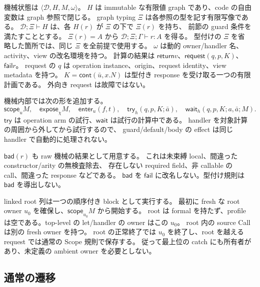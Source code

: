 \documentclass[11pt,a4paper]{article}
\newcommand{\Ret}{\mathsf{return}}
\newcommand{\Req}{\mathsf{request}}
\newcommand{\Fail}{\mathsf{fail}}
\newcommand{\Bad}{\mathsf{bad}}
\newcommand{\Scope}{\mathsf{scope}}
\newcommand{\D}{\mathcal D}
\newcommand{\ty}{\mathrel{\vdash}}
\begin{document}
機械状態は \(\langle\D,H,M,\omega\rangle\)。
\(H\) は immutable な有限値 graph であり、code の自由変数は graph 参照で閉じる。
graph typing \(\Xi\) は各参照の型を記す有限写像である。
\(\D;\Xi\ty H\) は、各 \(H(r)\) が \(\Xi\) の下で \(\Xi(r)\) を持ち、
前節の guard 条件を満たすこととする。
\(\Xi(r)=A\) から \(\D;\Xi;\Gamma\ty r:A\) を得る。
型付けの \(\Xi\) を省略した箇所では、同じ \(\Xi\) を全前提で使用する。
\(\omega\) は動的 owner/handler 名、activity、view の改名環境を持つ。
計算の結果は \(\Ret v\)、\(\Req(q,p,K)\)、\(\Fail r\)。
request の \(q\) は operation instance、origin、request identity、view metadata を持つ。
\(K=\mathsf{cont}(\bar u,x.N)\) は型付き response を受け取る一つの有限計画である。
外向き request は故障ではない。

機械内部では次の形を追加する。
\[
 \Scope_u M,\quad \mathsf{expose}_{\chi}M,\quad
 \mathsf{enter}_u(f,t),\quad
 \mathsf{try}_h(q,p,K;\bar a),\quad
 \mathsf{wait}_h(q,p,K;a,\bar a;M).
\]
\(\mathsf{try}\) は operation arm の試行、\(\mathsf{wait}\) は試行の計算中である。
handler を対象計算の周囲から外してから試行するので、
guard/default/body の effect は同じ handler で自動的に処理されない。

\(\Bad(r)\) も raw 機械の結果として用意する。
これは未束縛 local、間違った constructor/arity の無検査除去、
存在しない required field、非 callable の call、間違った response などである。
\(\Bad\) を \(\Fail\) に改名しない。型付け規則は \(\Bad\) を導出しない。

linked root 列は一つの順序付き block として実行する。
最初に fresh な root owner \(u_0\) を確保し、\(\Scope_{u_0}M\) から開始する。
root は formal を持たず、profile は空である。top-level の let/handler の owner はこの \(u_0\)。
root 内の source Call は別の fresh owner を持つ。
root の正常終了では \(u_0\) を終了し、root を越える request では通常の Scope 規則で保存する。
従って最上位の catch にも所有者があり、未定義の ambient owner を必要としない。

\subsection{通常の遷移}
\end{document}

